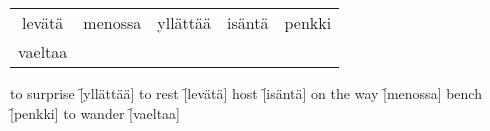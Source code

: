 \begin{center}
  \begin{tabular}{|c c c c c|}
    \hline
    levätä & menossa & yllättää & isäntä & penkki \\
    vaeltaa & & & & \\
    \hline
  \end{tabular}
\end{center}

\begin{questions}
  \begin{multicols}{2}
    \raggedcolumns
    \question to surprise \f[yllättää]
    \question to rest     \f[levätä]
    \question host        \f[isäntä]
    \question on the way  \f[menossa]
    \question bench       \f[penkki]
    \question to wander   \f[vaeltaa]
  \end{multicols}
\end{questions}
